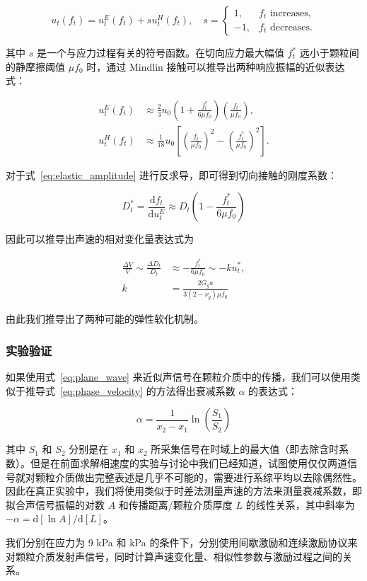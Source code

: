 \begin{equation}
  u_{t}(f_{t}) = u_{t}^{E}(f_{t}) + su_{t}^{H}(f_{t}),\quad s = \begin{cases}
    1, & f_{t} \text{ increases},\\
    -1, & f_{t} \text{ decreases}.
  \end{cases}
\end{equation}

其中 $s$ 是一个与应力过程有关的符号函数。在切向应力最大幅值 $f_{t}^{*}$ 远小于颗粒间的静摩擦阈值 $\mu f_{0}$ 时，通过 Mindlin 接触可以推导出两种响应振幅的近似表达式：

\begin{align}
  u_{t}^{E}(f_{t}) &\approx \frac{2}{3}u_{0}\left(1 + \frac{f_{t}^{*}}{6\mu f_{0}}\right)\left(\frac{f_{t}}{\mu f_{0}}\right),\label{eq:elastic_amplitude}\\
  u_{t}^{H}(f_{t}) &\approx \frac{1}{18}u_{0}\left[\left(\frac{f_{t}}{\mu f_{0}}\right)^{2} - \left(\frac{f_{t}^{*}}{\mu f_{0}}\right)^{2}\right].
\end{align}

对于式~\eqref{eq:elastic_amplitude} 进行反求导，即可得到切向接触的刚度系数：

\begin{equation}
  D_{t}^{*} = \frac{\mathrm{d}f_{t}}{\mathrm{d}u_{t}^{E}} \approx D_{t}\left(1 - \frac{f_{t}^{*}}{6\mu f_{0}}\right)
\end{equation}

因此可以推导出声速的相对变化量表达式为

\begin{align}
  \frac{\Delta V}{V}\sim \frac{\Delta D_{t}}{D_{t}} &\approx -\frac{f_{t}^{*}}{6\mu f_{0}} \sim -ku_{t}^{*},\\
  k &= \frac{2G_{g}a}{3(2-\nu_{g})\mu f_{0}}
\end{align}

由此我们推导出了两种可能的弹性软化机制。

\subsubsection{实验验证}

如果使用式~\eqref{eq:plane_wave} 来近似声信号在颗粒介质中的传播，我们可以使用类似于推导式~\eqref{eq:phase_velocity} 的方法得出衰减系数 $\alpha$ 的表达式：

\begin{equation}
  \alpha = \frac{1}{x_{2}-x_{1}}\ln{\left(\frac{S_{1}}{S_{2}}\right)}
\end{equation}

其中 $S_{1}$ 和 $S_{2}$ 分别是在 $x_{1}$ 和 $x_{2}$ 所采集信号在时域上的最大值（即去除含时系数）。但是在前面求解相速度的实验与讨论中我们已经知道，试图使用仅仅两道信号就对颗粒介质做出完整表述是几乎不可能的，需要进行系综平均以去除偶然性。因此在真正实验中，我们将使用类似于时差法测量声速的方法来测量衰减系数，即拟合声信号振幅的对数 $A$ 和传播距离/颗粒介质厚度 $L$ 的线性关系，其中斜率为 $-\alpha = \mathrm{d}[\ln{A}]/\mathrm{d}[L]$。

我们分别在应力为 9 \unit{\kilo\pascal} 和 \unit{\kilo\pascal} 的条件下，分别使用间歇激励和连续激励协议来对颗粒介质发射声信号，同时计算声速变化量、相似性参数与激励过程之间的关系。
